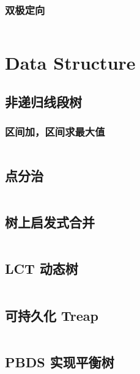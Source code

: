 \documentclass[titlepage, a4paper, 11pt]{article}
\begin{document}
\begin{spacing}{1.15}
					\subsubsection{双极定向}
					\inputminted{cpp}{src/tbr/bipolar_orientation.cpp}
					

			\section{Data Structure}
				\subsection{非递归线段树}
					\subsubsection{区间加，区间求最大值}
						\inputminted{cpp}{src/DataStructure/非递归线段树求最大值.cpp}
				\subsection{点分治}
					\inputminted{cpp}{src/DataStructure/点分治.cpp}
				\subsection{树上启发式合并}
					\inputminted{cpp}{src/DataStructure/dsu_on_tree.cpp}
				\subsection{LCT 动态树}
					\inputminted{cpp}{src/DataStructure/LCT.cpp}
				\subsection{可持久化 Treap}
					\inputminted{cpp}{src/DataStructure/可持久化treap-zmc.cpp}
				\subsection{PBDS 实现平衡树}
					\inputminted{cpp}{src/DataStructure/pbds.cpp}

\end{spacing}
\end{document}

